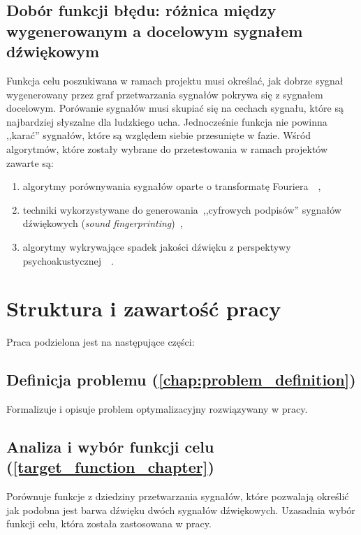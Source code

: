 \subsection{Dobór funkcji błędu: różnica między wygenerowanym a docelowym sygnałem dźwiękowym}

Funkcja celu poszukiwana w ramach projektu musi określać, jak dobrze sygnał wygenerowany przez
graf przetwarzania sygnałów pokrywa się z sygnałem docelowym. Porówanie sygnałów musi skupiać się
na cechach sygnału, które są najbardziej słyszalne dla ludzkiego ucha. Jednocześnie funkcja nie powinna
,,karać'' sygnałów, które są względem siebie przesunięte w fazie. Wśród algorytmów, które zostały wybrane
do przetestowania w ramach projektów zawarte są:

\begin{enumerate}
  \item algorytmy porównywania sygnałów oparte o transformatę Fouriera~\cite{sliding_fourier}~\cite{mfcc},
  \item techniki wykorzystywane do generowania~,,cyfrowych podpisów'' sygnałów dźwiękowych (\textit{sound fingerprinting})~\cite{computer_vision_music_identification},
  \item algorytmy wykrywające spadek jakości dźwięku z perspektywy psychoakustycznej~\cite{peaq}~\cite{frechet_audio_distance}.
\end{enumerate}

\section{Struktura i zawartość pracy}

Praca podzielona jest na następujące części:

\subsection*{Definicja problemu (\ref{chap:problem_definition})}

Formalizuje i opisuje problem optymalizacyjny rozwiązywany w pracy.

\subsection*{Analiza i wybór funkcji celu (\ref{target_function_chapter}) }

Porównuje funkcje z dziedziny przetwarzania sygnałów, które pozwalają określić jak podobna jest barwa dźwięku dwóch sygnałów dźwiękowych.
Uzasadnia wybór funkcji celu, która została zastosowana w pracy.

